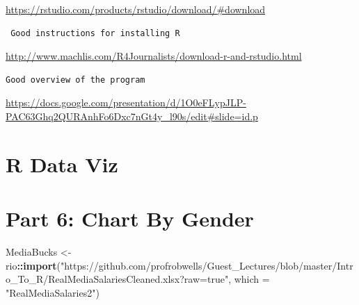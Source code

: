 \documentclass[]{book}
\newenvironment{Shaded}{\begin{snugshade}}{\end{snugshade}}
\newcommand{\DataTypeTok}[1]{\textcolor[rgb]{0.13,0.29,0.53}{#1}}
\newcommand{\KeywordTok}[1]{\textcolor[rgb]{0.13,0.29,0.53}{\textbf{#1}}}
\newcommand{\NormalTok}[1]{#1}
\newcommand{\OperatorTok}[1]{\textcolor[rgb]{0.81,0.36,0.00}{\textbf{#1}}}
\newcommand{\StringTok}[1]{\textcolor[rgb]{0.31,0.60,0.02}{#1}}
\begin{document}
\url{https://rstudio.com/products/rstudio/download/\#download}

\begin{verbatim}
 Good instructions for installing R
\end{verbatim}

\url{http://www.machlis.com/R4Journalists/download-r-and-rstudio.html}

\begin{verbatim}
Good overview of the program
\end{verbatim}

\url{https://docs.google.com/presentation/d/1O0eFLypJLP-PAC63Ghq2QURAnhFo6Dxc7nGt4y_l90s/edit\#slide=id.p}

\hypertarget{r-data-viz}{%
\chapter{R Data Viz}\label{r-data-viz}}

\hypertarget{part-6-chart-by-gender}{%
\chapter{Part 6: Chart By Gender}\label{part-6-chart-by-gender}}

\begin{Shaded}
\begin{Highlighting}[]
\NormalTok{MediaBucks <-}\StringTok{ }\NormalTok{rio}\OperatorTok{::}\KeywordTok{import}\NormalTok{(}\StringTok{"https://github.com/profrobwells/Guest_Lectures/blob/master/Intro_To_R/RealMediaSalariesCleaned.xlsx?raw=true"}\NormalTok{, }\DataTypeTok{which =} \StringTok{"RealMediaSalaries2"}\NormalTok{)}
\end{Highlighting}
\end{Shaded}

\begin{Shaded}
\end{Shaded}
\end{document}
